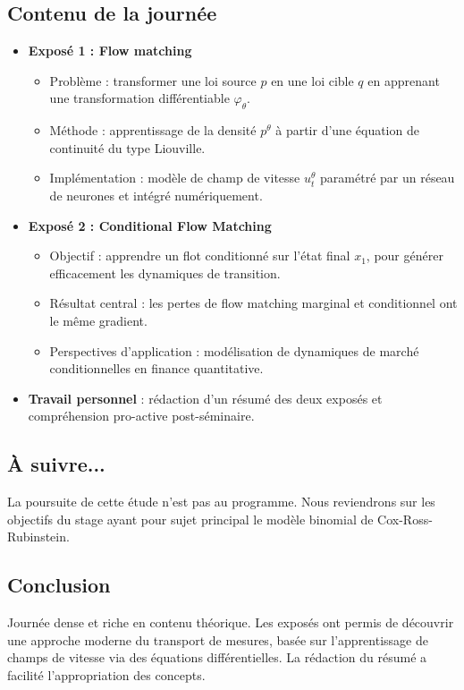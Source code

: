 \documentclass[a4paper,11pt]{article}
\begin{document}
\subsection{Contenu de la journée}

\begin{itemize}
    \item \textbf{Exposé 1 : Flow matching}
    \begin{itemize}
        \item Problème : transformer une loi source \( p \) en une loi cible \( q \) en apprenant une transformation différentiable \( \varphi_\theta \).
        \item Méthode : apprentissage de la densité \( p^\theta \) à partir d’une équation de continuité du type Liouville.
        \item Implémentation : modèle de champ de vitesse \( u_t^\theta \) paramétré par un réseau de neurones et intégré numériquement.
    \end{itemize}
    
    \item \textbf{Exposé 2 : Conditional Flow Matching}
    \begin{itemize}
        \item Objectif : apprendre un flot conditionné sur l’état final \( x_1 \), pour générer efficacement les dynamiques de transition.
        \item Résultat central : les pertes de flow matching marginal et conditionnel ont le même gradient.
        \item Perspectives d’application : modélisation de dynamiques de marché conditionnelles en finance quantitative.
    \end{itemize}

    \item \textbf{Travail personnel} : rédaction d’un résumé des deux exposés et compréhension pro-active post-séminaire.
\end{itemize}

\subsection{À suivre...}
La poursuite de cette étude n'est pas au programme. Nous reviendrons sur les objectifs du stage ayant pour sujet principal le modèle binomial de Cox-Ross-Rubinstein.

\subsection{Conclusion}
Journée dense et riche en contenu théorique. Les exposés ont permis de découvrir une approche moderne du transport de mesures, basée sur l’apprentissage de champs de vitesse via des équations différentielles. La rédaction du résumé a facilité l’appropriation des concepts.
\end{document}
